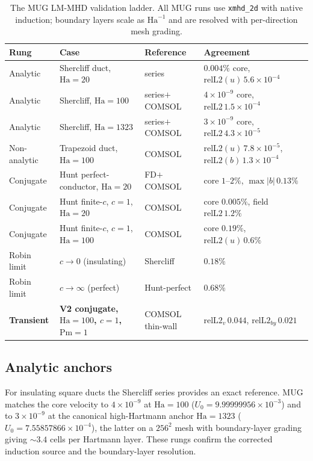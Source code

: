 \documentclass[11pt,letterpaper]{article}
\newcommand{\Ha}{\mathrm{Ha}}
\newcommand{\Pm}{\mathrm{Pm}}
\newcommand{\relL}{\mathrm{relL2}}
\begin{document}
\begin{table}[t]
\centering
\small
\begin{tabular}{@{}llll@{}}
\toprule
Rung & Case & Reference & Agreement \\
\midrule
Analytic & Shercliff duct, $\Ha=20$ & series & $0.004\%$ core, $\relL(u)\,5.6\!\times\!10^{-4}$ \\
Analytic & Shercliff, $\Ha=100$ & series$+$COMSOL & $4\!\times\!10^{-9}$ core, $\relL\,1.5\!\times\!10^{-4}$ \\
Analytic & Shercliff, $\Ha=1323$ & series$+$COMSOL & $3\!\times\!10^{-9}$ core, $\relL\,4.3\!\times\!10^{-5}$ \\
Non-analytic & Trapezoid duct, $\Ha=100$ & COMSOL & $\relL(u)\,7.8\!\times\!10^{-5}$, $\relL(b)\,1.3\!\times\!10^{-4}$ \\
Conjugate & Hunt perfect-conductor, $\Ha=20$ & FD$+$COMSOL & core $1$--$2\%$, $\max|b|\,0.13\%$ \\
Conjugate & Hunt finite-$c$, $c\!=\!1$, $\Ha=20$ & COMSOL & core $0.005\%$, field $\relL\,1.2\%$ \\
Conjugate & Hunt finite-$c$, $c\!=\!1$, $\Ha=100$ & COMSOL & core $0.19\%$, $\relL(u)\,0.6\%$ \\
Robin limit & $c\!\to\!0$ (insulating) & Shercliff & $0.18\%$ \\
Robin limit & $c\!\to\!\infty$ (perfect) & Hunt-perfect & $0.68\%$ \\
\textbf{Transient} & \textbf{V2 conjugate, $\Ha=100$, $c\!=\!1$, $\Pm=1$} & COMSOL thin-wall & $\relL_v\,0.044$, $\relL_{by}\,0.021$ \\
\bottomrule
\end{tabular}
\caption{The MUG LM-MHD validation ladder. All MUG runs use \texttt{xmhd\_2d} with
native induction; boundary layers scale as $\Ha^{-1}$ and are resolved with
per-direction mesh grading.}
\label{tab:ladder}
\end{table}

\subsection{Analytic anchors}
For insulating square ducts the Shercliff series provides an exact reference. MUG
matches the core velocity to $4\times10^{-9}$ at $\Ha=100$ ($U_0=9.99999956\times
10^{-3}$) and to $3\times10^{-9}$ at the canonical high-Hartmann anchor $\Ha=1323$
($U_0=7.55857866\times10^{-4}$), the latter on a $256^2$ mesh with boundary-layer
grading giving $\sim\!3.4$ cells per Hartmann layer. These rungs confirm the
corrected induction source and the boundary-layer resolution.
\end{document}
